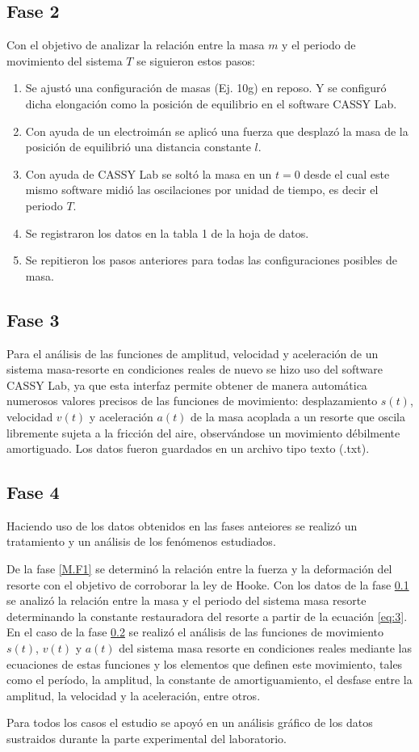 \documentclass[spanish,notitlepage,letterpaper, 12pt]{article}
\begin{document}
\subsection{Fase 2} \label{M.F2}
Con el objetivo de analizar la relación entre la masa $m$ y el periodo de movimiento del sistema $T$ se siguieron estos pasos:
\begin{enumerate}
    \item Se ajustó una configuración de masas (Ej. 10g) en reposo. Y se configuró dicha elongación como la posición de equilibrio en el software CASSY Lab.
    \item Con ayuda de un electroimán se aplicó una fuerza que desplazó la masa de la posición de equilibrió una distancia constante $l$.
    \item Con ayuda de CASSY Lab se soltó la masa en un $t=0$ desde el cual este mismo software midió las oscilaciones por unidad de tiempo, es decir el periodo $T$.
    \item Se registraron los datos en la tabla 1 de la hoja de datos.
    \item Se repitieron los pasos anteriores para todas las configuraciones posibles de masa.
\end{enumerate}
\subsection{Fase 3} \label{M.F3}
Para el análisis de las funciones de amplitud, velocidad y aceleración de un sistema masa-resorte en condiciones reales de nuevo se hizo uso del software CASSY Lab, ya que esta interfaz permite obtener de manera automática numerosos valores precisos de las funciones de movimiento: desplazamiento $s(t)$, velocidad $v(t)$ y aceleración $a(t)$ de la masa acoplada a un resorte que oscila libremente sujeta a la fricción del aire, observándose un movimiento débilmente amortiguado. Los datos fueron guardados en un archivo tipo texto (.txt). 
\subsection{Fase 4}
Haciendo uso de los datos obtenidos en las fases anteiores se realizó un tratamiento y un análisis de los fenómenos estudiados.\par
\bigskip
De la fase \ref{M.F1} se determinó la relación entre la fuerza y la deformación del resorte con el objetivo de corroborar la ley de Hooke. Con los datos de la fase \ref{M.F2} se analizó la relación entre la masa y el periodo del sistema masa resorte determinando la constante restauradora del resorte
a partir de la ecuación \eqref{eq:3}. En el caso de la fase \ref{M.F3} se realizó el análisis de las funciones de movimiento $s(t)$, $v(t)$ y $a(t)$ del sistema masa resorte en condiciones reales mediante las ecuaciones de estas funciones y los elementos que definen este movimiento, tales como el
período, la amplitud, la constante de amortiguamiento, el desfase entre la amplitud, la velocidad y la aceleración, entre otros.\par
\bigskip
Para todos los casos el estudio se apoyó en un análisis gráfico de los datos sustraidos durante la parte experimental del laboratorio. 
\end{document}

